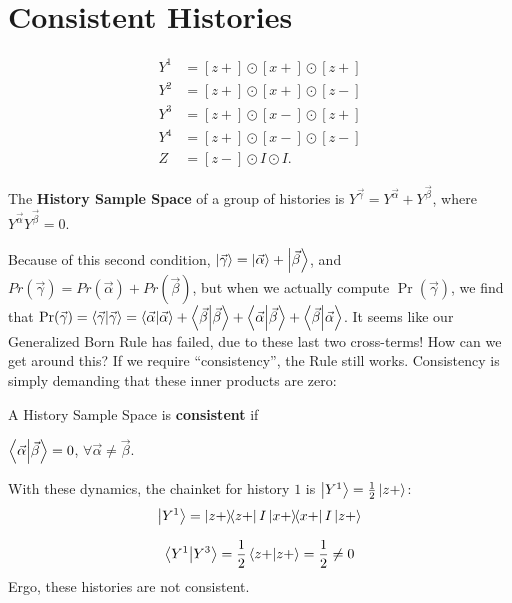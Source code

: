 \documentclass[a4paper,twoside,master.tex]{subfiles}
\begin{document}
\section{Consistent Histories}%
\label{sec:consistent_histories}

\begin{align}
    Y^1&=[z+]\odot[x+]\odot[z+]\\
    Y^2&=[z+]\odot[x+]\odot[z-]\\
    Y^3&=[z+]\odot[x-]\odot[z+]\\
    Y^4&=[z+]\odot[x-]\odot[z-]\\
    Z&=[z-]\odot I\odot I
.\end{align}

\begin{definition}
    The \textbf{History Sample Space} of a group of histories is $Y^{\vec{\gamma}} = Y^{\vec{\alpha}} + Y^{\vec{\beta}}$, where $Y^{\vec{\alpha}}Y^{\vec{\beta}} = 0$.
\end{definition}

Because of this second condition, $\ket{\vec{\gamma}} = \ket{\vec{\alpha}} + \ket{\vec{\beta}}$, and $Pr(\vec{\gamma}) = Pr(\vec{\alpha})+Pr(\vec{\beta}) $, but when we actually compute $ \Pr( \vec{\gamma} ) $, we find that $ \Pr( \vec{\gamma}) = \ip{\vec{\gamma}} = \ip{\vec{\alpha}} + \ip{\vec{\beta}} + \ip{\vec{\alpha}}{\vec{\beta}} + \ip{\vec{\beta}}{\vec{\alpha}}$. It seems like our Generalized Born Rule has failed, due to these last two cross-terms! How can we get around this? If we require ``consistency'', the Rule still works. Consistency is simply demanding that these inner products are zero:

\begin{definition}
    A History Sample Space is \textbf{consistent} if

    $\ip{\vec{\alpha}}{\vec{\beta}} = 0$, $\forall \vec{\alpha}\neq \vec{\beta}$.
\end{definition}

With these dynamics, the chainket for history $1$ is $\ket{Y^1} = \frac{1}{2}\ket{z+}$:
\begin{equation}
    \ket{Y^1} = \op{z+} I \op{x+} I \ket{z+} 
\end{equation}

\begin{equation}
    \ip{Y^1}{Y^3} = \frac{1}{2}\ip{z+}=\frac{1}{2}\neq 0
\end{equation}
Ergo, these histories are not consistent.
\end{document}
